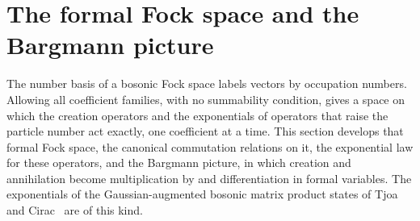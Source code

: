 \providecommand{\ket}[1]{\lvert #1\rangle}
\providecommand{\bra}[1]{\langle #1\rvert}
\providecommand{\Tr}{\operatorname{Tr}}
\providecommand{\N}{\mathbb N}
\providecommand{\Fock}{\mathcal F}
\providecommand{\Barg}{\mathfrak B}
\providecommand{\coef}[2]{[z^{#1}]\,#2}
\clearpage
\section{The formal Fock space and the Bargmann picture}\label{sec:fock}
The number basis of a bosonic Fock space labels vectors by occupation numbers. Allowing all
coefficient families, with no summability condition, gives a space on which the creation
operators and the exponentials of operators that raise the particle number act exactly, one
coefficient at a time. This section develops that formal Fock space, the canonical
commutation relations on it, the exponential law for these operators, and the Bargmann
picture, in which creation and annihilation become multiplication by and differentiation in
formal variables. The exponentials of the Gaussian-augmented bosonic matrix product states of
Tjoa and Cirac~\cite{tjoacirac} are of this kind. 

